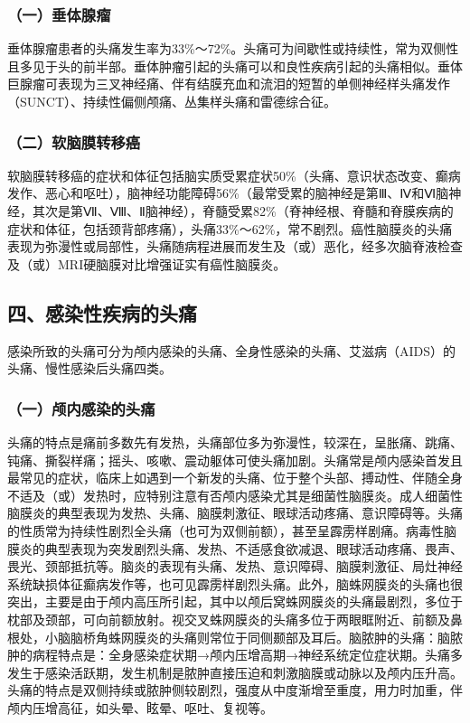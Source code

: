 \subsubsection{（一）垂体腺瘤}

垂体腺瘤患者的头痛发生率为33\%～72\%。头痛可为间歇性或持续性，常为双侧性且多见于头的前半部。垂体肿瘤引起的头痛可以和良性疾病引起的头痛相似。垂体巨腺瘤可表现为三叉神经痛、伴有结膜充血和流泪的短暂的单侧神经样头痛发作（SUNCT）、持续性偏侧颅痛、丛集样头痛和雷德综合征。

\subsubsection{（二）软脑膜转移癌}

软脑膜转移癌的症状和体征包括脑实质受累症状50\%（头痛、意识状态改变、癫病发作、恶心和呕吐），脑神经功能障碍56\%（最常受累的脑神经是第Ⅲ、Ⅳ和Ⅵ脑神经，其次是第Ⅶ、Ⅷ、Ⅱ脑神经），脊髓受累82\%（脊神经根、脊髓和脊膜疾病的症状和体征，包括颈背部疼痛），头痛33\%～62\%，常不剧烈。癌性脑膜炎的头痛表现为弥漫性或局部性，头痛随病程进展而发生及（或）恶化，经多次脑脊液检查及（或）MRI硬脑膜对比增强证实有癌性脑膜炎。

\subsection{四、感染性疾病的头痛}

感染所致的头痛可分为颅内感染的头痛、全身性感染的头痛、艾滋病（AIDS）的头痛、慢性感染后头痛四类。

\subsubsection{（一）颅内感染的头痛}

头痛的特点是痛前多数先有发热，头痛部位多为弥漫性，较深在，呈胀痛、跳痛、钝痛、撕裂样痛；摇头、咳嗽、震动躯体可使头痛加剧。头痛常是颅内感染首发且最常见的症状，临床上如遇到一个新发的头痛、位于整个头部、搏动性、伴随全身不适及（或）发热时，应特别注意有否颅内感染尤其是细菌性脑膜炎。成人细菌性脑膜炎的典型表现为发热、头痛、脑膜刺激征、眼球活动疼痛、意识障碍等。头痛的性质常为持续性剧烈全头痛（也可为双侧前额），甚至呈霹雳样剧痛。病毒性脑膜炎的典型表现为突发剧烈头痛、发热、不适感食欲减退、眼球活动疼痛、畏声、畏光、颈部抵抗等。脑炎的表现有头痛、发热、意识障碍、脑膜刺激征、局灶神经系统缺损体征癫病发作等，也可见霹雳样剧烈头痛。此外，脑蛛网膜炎的头痛也很突出，主要是由于颅内高压所引起，其中以颅后窝蛛网膜炎的头痛最剧烈，多位于枕部及颈部，可向前额放射。视交叉蛛网膜炎的头痛多位于两眼眶附近、前额及鼻根处，小脑脑桥角蛛网膜炎的头痛则常位于同侧颞部及耳后。脑脓肿的头痛：脑脓肿的病程特点是：全身感染症状期→颅内压增高期→神经系统定位症状期。头痛多发生于感染活跃期，发生机制是脓肿直接压迫和刺激脑膜或动脉以及颅内压升高。头痛的特点是双侧持续或脓肿侧较剧烈，强度从中度渐增至重度，用力时加重，伴颅内压增高征，如头晕、眩晕、呕吐、复视等。

